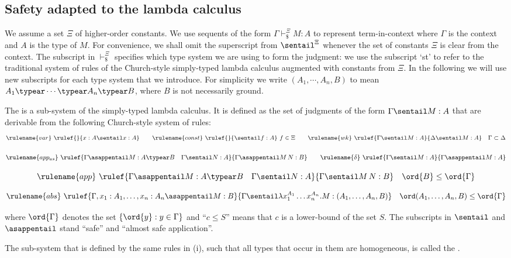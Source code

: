\subsection*{Safety adapted to the lambda calculus}
We assume a set $\Xi$ of higher-order constants. We use sequents of
the form $\Gamma \vdash_\$^\Xi M : A$ to represent term-in-context
where $\Gamma$ is the context and $A$ is the type of $M$. For
convenience, we shall omit the superscript from $\sentail^\Xi$
whenever the set of constants $\Xi$ is clear from the context. The
subscript in $\vdash_\$^\Xi$ specifies which type system we are
using to form the judgment: we use the subscript `st' to refer to
the traditional system of rules of the Church-style simply-typed
lambda calculus augmented with constants from $\Xi$. In the
following we will use new subscripts for each type system that we
introduce. For simplicity we write $(A_1, \cdots, A_n, B)$ to mean
$A_1 \typear \cdots \typear A_n \typear B$, where $B$ is not
necessarily ground.

\begin{definition}\rm
\label{def:safelambda}
\begin{inparaenum}[(i)]
\item The  is a sub-system of the
  simply-typed lambda calculus. It is defined as the set of judgments of the form $\Gamma \sentail M : A$ that are derivable from the following Church-style system of rules:
$$ \rulename{var} \ \rulef{}{x : A\sentail x : A} \qquad
\rulename{const} \ \rulef{}{\sentail f : A}~f \in \Xi \qquad
\rulename{wk} \ \rulef{\Gamma \sentail M : A}{\Delta \sentail M : A} \quad
\Gamma \subset \Delta$$

$$ \rulename{app_{as}} \ \rulef{\Gamma \asappentail M : A\typear B
\quad \Gamma \sentail N : A} {\Gamma \asappentail M\, N : B}
\qquad
\rulename{\delta} \ \rulef{\Gamma \sentail M : A}{\Gamma \asappentail M : A}
$$

$$ \rulename{app} \ \rulef{\Gamma \asappentail M : A\typear B
\quad \Gamma \sentail N : A} {\Gamma \sentail M\, N : B} \quad \ord{B} \leq
\ord{\Gamma}$$

$$ \rulename{abs} \ \rulef{\Gamma, x_1 : A_1, \ldots, x_n : A_n
  \asappentail M : B} {\Gamma \sentail \lambda x_1^{A_1} \ldots x_n^{A_n} . M :
  (A_1, \ldots ,A_n,B)} \quad \ord(A_1, \ldots ,A_n,B) \leq
\ord{\Gamma}$$
\smallskip

\noindent where $\ord{\Gamma}$ denotes the set $\{ \ord{y} : y \in
\Gamma \}$ and ``$c \leq S$'' means that $c$ is a lower-bound of the
set $S$. The subscripts in $\sentail$ and $\asappentail$ stand
``safe'' and ``almost safe application''.

\noindent \item The sub-system that is defined by the same rules in
(i), such that all types that occur in them are homogeneous, is called
the .
\end{inparaenum}
\end{definition}


